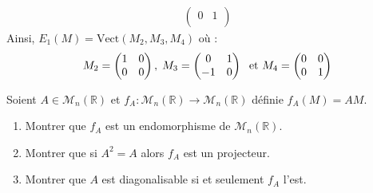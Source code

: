 \documentclass[a4paper,10pt]{report}
\begin{document}
\begin{enumerate}
\begin{itemize}
\begin{align*}
\begin{pmatrix}
0 & 1 \\ 
\end{pmatrix} 
\end{align*}
Ainsi, $E_1(M) = \textrm{Vect}(M_2,M_3,M_4)$ où :
$$ M_2 = \begin{pmatrix} 1 & 0 \\
0 & 0 \\ 
\end{pmatrix} , \; M_3= \begin{pmatrix}
0 & 1 \\
-1 & 0
\end{pmatrix} \; \hbox{ et } M_4 = \begin{pmatrix} 0 & 0 \\
0 & 1 \\ 
\end{pmatrix}  $$
\end{itemize}
\end{enumerate}

\begin{Exercice}{} Soient $A \in \mathcal{M}_n(\mathbb{R})$ et $f_A : \mathcal{M}_n(\mathbb{R}) \rightarrow \mathcal{M}_n(\mathbb{R})$ définie $f_A(M)=AM$.

\begin{enumerate}
\item Montrer que $f_A$ est un endomorphisme de $\mathcal{M}_n(\mathbb{R})$.
\item Montrer que si $A^2=A$ alors $f_A$ est un projecteur.
\item Montrer que $A$ est diagonalisable si et seulement $f_A$ l'est.
\end{enumerate}
\end{Exercice}

\corr 
\end{document}
